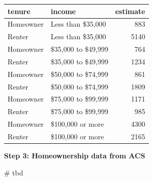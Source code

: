 \documentclass[
  letterpaper,
  DIV=11,
  numbers=noendperiod]{scrartcl}
\newenvironment{Shaded}{\begin{snugshade}}{\end{snugshade}}
\newcommand{\AttributeTok}[1]{\textcolor[rgb]{0.40,0.45,0.13}{#1}}
\newcommand{\CommentTok}[1]{\textcolor[rgb]{0.37,0.37,0.37}{#1}}
\newcommand{\FunctionTok}[1]{\textcolor[rgb]{0.28,0.35,0.67}{#1}}
\newcommand{\NormalTok}[1]{\textcolor[rgb]{0.00,0.23,0.31}{#1}}
\newcommand{\SpecialCharTok}[1]{\textcolor[rgb]{0.37,0.37,0.37}{#1}}
\newcommand{\StringTok}[1]{\textcolor[rgb]{0.13,0.47,0.30}{#1}}
\begin{document}
\begin{Shaded}
\end{Shaded}

\begin{table}
\centering
\begin{tabular}{l|l|r}
\hline
tenure & income & estimate\\
\hline
Homeowner & Less than \$35,000 & 883\\
\hline
Renter & Less than \$35,000 & 5140\\
\hline
Homeowner & \$35,000 to \$49,999 & 764\\
\hline
Renter & \$35,000 to \$49,999 & 1234\\
\hline
Homeowner & \$50,000 to \$74,999 & 861\\
\hline
Renter & \$50,000 to \$74,999 & 1809\\
\hline
Homeowner & \$75,000 to \$99,999 & 1171\\
\hline
Renter & \$75,000 to \$99,999 & 985\\
\hline
Homeowner & \$100,000 or more & 4300\\
\hline
Renter & \$100,000 or more & 2165\\
\hline
\end{tabular}
\end{table}

\textbf{Step 3: Homeownership data from ACS}

\begin{Shaded}
\begin{Highlighting}[]
\CommentTok{\# tbd}
\end{Highlighting}
\end{Shaded}
\end{document}
